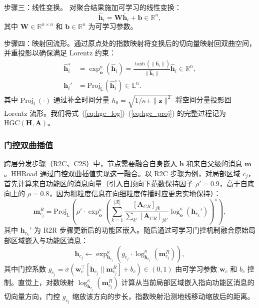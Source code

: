 步骤三：线性变换。 对聚合结果施加可学习的线性变换：
\begin{equation}
    \hat{\mathbf{h}}_i = \mathbf{W} \bar{\mathbf{h}}_i + \mathbf{b}
    \in \mathbb{R}^{n},
    \label{eq:hgc_linear}
\end{equation}
其中 $\mathbf{W} \in \mathbb{R}^{n \times n}$ 和 $\mathbf{b} \in \mathbb{R}^{n}$ 为可学习参数。

步骤四：映射回流形。通过原点处的指数映射将变换后的切向量映射回双曲空间，并重投影以确保满足 Lorentz 约束：
\begin{align}
    \hat{\mathbf{h}}_i^{s} &= \exp_{\mathbf{o}}^{\kappa}(\hat{\mathbf{h}}_i)
    = \frac{\tanh(\|\hat{\mathbf{h}}_i\|)}{\|\hat{\mathbf{h}}_i\|} \hat{\mathbf{h}}_i
    \in \mathbb{R}^{n}, \label{eq:hgc_exp} \\[4pt]
    \mathbf{h}_i' &= \text{Proj}_{\mathbb{L}}\!\left(\hat{\mathbf{h}}_i^{s}\right)
    \in \mathbb{L}^{n}. \label{eq:hgc_proj}
\end{align}
其中 $\text{Proj}_{\mathbb{L}}(\cdot)$ 通过补全时间分量 $h_0 = \sqrt{1/\kappa + \|\mathbf{z}\|^2}$ 将空间分量投影回 Lorentz 流形。我们将式~(\ref{eq:hgc_log})--(\ref{eq:hgc_proj}) 的完整过程记为 $\text{HGC}(\mathbf{H}, \mathbf{A})$。

\subsubsection{门控双曲插值}

跨层分发步骤（R2C、C2S）中，节点需要融合自身嵌入 $\mathbf{h}$ 和来自父级的消息 $\mathbf{m}$。HHRoad 通过门控双曲插值实现这一融合。以 R2C 步骤为例，对局部区域 $c_j$，首先计算来自功能区的消息向量（引入自顶向下范数保持因子 $\rho' = 0.9$，高于自底向上的 $\rho = 0.8$，因为粗粒度信息在向细粒度传播时应更忠实地保持）：
\begin{equation}
    \mathbf{m}_{c_j}^{R} = \text{Proj}_{\mathbb{L}}\!\left(
      \rho' \cdot \exp_{\mathbf{o}}^\kappa\!\left(
        \sum_{k=1}^{|\mathcal{R}|} \frac{[\mathbf{A}_{CR}]_{jk}}{\sum_{k'} [\mathbf{A}_{CR}]_{jk'}}
        \log_{\mathbf{o}}^\kappa(\mathbf{h}_{r_k}')
      \right)^s
    \right),
    \label{eq:f2c_msg}
\end{equation}
其中 $\mathbf{h}_{r_k}'$ 为 R2R 步骤更新后的功能区嵌入。随后通过可学习门控机制融合原始局部区域嵌入与功能区消息：
\begin{equation}
    \mathbf{h}_{c_j} \leftarrow \exp_{\mathbf{h}_{c_j}}^\kappa\!\left(
      g_{c_j} \cdot \log_{\mathbf{h}_{c_j}}^\kappa(\mathbf{m}_{c_j}^{R})
    \right),
    \label{eq:gate_loc}
\end{equation}
其中门控系数 $g_{c_j} = \sigma\!\left(\mathbf{w}_c^\top [\mathbf{h}_{c_j} \| \mathbf{m}_{c_j}^{R}] + b_c\right) \in (0,1)$ 由可学习参数 $\mathbf{w}_c$ 和 $b_c$ 控制。直觉上，对数映射 $\log_{\mathbf{h}_{c_j}}^\kappa(\mathbf{m}_{c_j}^{R})$ 计算从当前局部区域嵌入指向功能区消息的切向量方向，门控 $g_{c_j}$ 缩放该方向的步长，指数映射沿测地线移动缩放后的距离。

